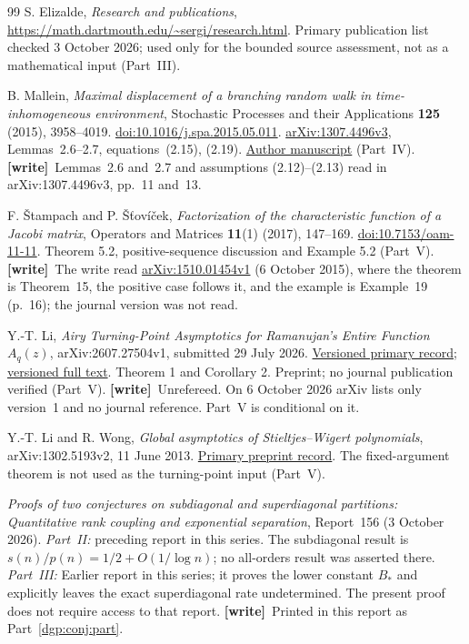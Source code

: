 \documentclass[11pt,letterpaper]{article}
\numberwithin{equation}{section}
\theoremstyle{remark}\newtheorem{remark}[theorem]{Remark}
\newcommand{\wtag}{\textup{\textbf{[write]}}}
\begin{document}
\begin{thebibliography}{99}
S. Elizalde, \emph{Research and publications},
\url{https://math.dartmouth.edu/~sergi/research.html}.
Primary publication list checked 3 October 2026; used only for the bounded
source assessment, not as a mathematical input (Part~III).

B. Mallein, \emph{Maximal displacement of a branching random walk in
time-inhomogeneous environment}, Stochastic Processes and their
Applications \textbf{125} (2015), 3958--4019.
\href{https://doi.org/10.1016/j.spa.2015.05.011}{doi:10.1016/j.spa.2015.05.011}.
\href{https://arxiv.org/pdf/1307.4496v3}{arXiv:1307.4496v3},
Lemmas~2.6--2.7, equations~(2.15), (2.19).
\href{https://www.math.univ-toulouse.fr/~bmallein/publications/brwtie.pdf}{Author manuscript} (Part~IV).
\wtag\ Lemmas~2.6 and~2.7 and assumptions (2.12)--(2.13) read in arXiv:1307.4496v3, pp.~11 and~13.

F. \v{S}tampach and P. \v{S}\v{t}ov\'i\v{c}ek,
\emph{Factorization of the characteristic function of a Jacobi matrix},
Operators and Matrices \textbf{11}(1) (2017), 147--169.
\href{https://doi.org/10.7153/oam-11-11}{doi:10.7153/oam-11-11}.
Theorem 5.2, positive-sequence discussion and Example 5.2 (Part~V).
\wtag\ The write read \href{https://arxiv.org/abs/1510.01454v1}{arXiv:1510.01454v1} (6 October 2015), where the theorem is Theorem~15, the positive case follows it, and the example is Example~19 (p.~16); the journal version was not read.

Y.-T. Li,
\emph{Airy Turning-Point Asymptotics for Ramanujan's Entire Function
$A_q(z)$}, arXiv:2607.27504v1, submitted 29 July 2026.
\href{https://arxiv.org/abs/2607.27504v1}{Versioned primary record};
\href{https://arxiv.org/html/2607.27504v1}{versioned full text}.
Theorem 1 and Corollary 2. Preprint; no journal publication verified (Part~V).
\wtag\ Unrefereed. On 6 October 2026 arXiv lists only version~1 and no journal reference. Part~V is conditional on it.

Y.-T. Li and R. Wong, \emph{Global asymptotics of Stieltjes--Wigert polynomials}, arXiv:1302.5193v2, 11 June 2013.
\href{https://arxiv.org/abs/1302.5193v2}{Primary preprint record}.
The fixed-argument theorem is not used as the turning-point input (Part~V).

\emph{Proofs of two conjectures on subdiagonal and superdiagonal
partitions: Quantitative rank coupling and exponential separation},
Report~156 (3 October 2026).
\emph{Part~II:} preceding report in this series.
The subdiagonal result is $s(n)/p(n)=1/2+O(1/\log n)$;
no all-orders result was asserted there.
\emph{Part~III:} Earlier report in this series; it proves the
lower constant $B_*$ and explicitly leaves the exact superdiagonal rate
undetermined. The present proof does not require access to that report.
\wtag\ Printed in this report as Part~\ref{dgp:conj:part}.


\end{thebibliography}
\end{document}
